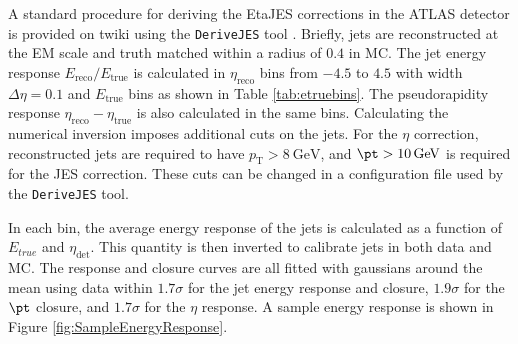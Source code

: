 \documentclass[NOTE, atlasdraft=true, texlive=2016, USenglish]{\ATLASLATEXPATH atlasdoc}
\begin{document}
A standard procedure for deriving the EtaJES corrections in the ATLAS detector is provided on twiki using the \texttt{DeriveJES} tool \cite{DeriveMCJES2015}. Briefly, jets are reconstructed at the EM scale and truth matched within a radius of $0.4$ in MC. The jet energy response $E_{\text{reco}}/E_{\text{true}}$ is calculated in $\eta_{\text{reco}}$ bins from $-4.5$ to $4.5$ with width $\Delta\eta = 0.1$ and $E_{\text{true}}$ bins as shown in Table \ref{tab:etruebins}. The pseudorapidity response $\eta_{\text{reco}}-\eta_{\text{true}}$ is also calculated in the same bins. Calculating the numerical inversion imposes additional cuts on the jets. For the $\eta$ correction, reconstructed jets are required to have $p_{\text{T}} > \SI{8}{\GeV}$, and $\pt > \SI{10}{\GeV}$ is required for the JES correction. These cuts can be changed in a configuration file used by the \texttt{DeriveJES} tool.\par
In each bin, the average energy response of the jets is calculated as a function of $E_{true}$ and $\eta_{\text{det}}$. This quantity is then inverted to calibrate jets in both data and MC. The response and closure curves are all fitted with gaussians around the mean using data within $1.7\sigma$ for the jet energy response and closure, $1.9\sigma$ for the $\pt$ closure, and $1.7\sigma$ for the $\eta$ response. A sample energy response is shown in Figure \ref{fig:SampleEnergyResponse}.
\begin{center}
\begin{table}
\caption{$E_{\text{true}}$ bin edges used in deriving the EtaJES corrections.}
\label{tab:etruebins}
\end{table}
\end{center}
\end{document}
